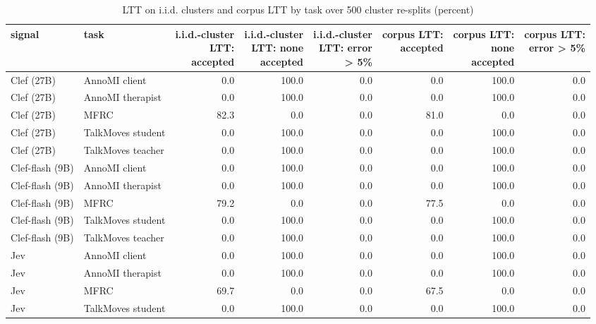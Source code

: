\begin{table}[t]
\centering
\small
\caption{LTT on i.i.d. clusters and corpus LTT by task over 500 cluster re-splits (percent)}
\label{tab:tab07d_resplits_guaranteed}
\begin{adjustbox}{max width=\linewidth}
\begin{tabular}{llrrrrrr}
\toprule
signal & task & \makecell[br]{i.i.d.-cluster \\{} LTT: \\{} accepted} & \makecell[br]{i.i.d.-cluster \\{} LTT: none \\{} accepted} & \makecell[br]{i.i.d.-cluster \\{} LTT: error \\{} > 5\%} & \makecell[br]{corpus LTT: \\{} accepted} & \makecell[br]{corpus LTT: \\{} none \\{} accepted} & \makecell[br]{corpus LTT: \\{} error > 5\%} \\
\midrule
Clef (27B) & AnnoMI client & 0.0 & 100.0 & 0.0 & 0.0 & 100.0 & 0.0 \\
Clef (27B) & AnnoMI therapist & 0.0 & 100.0 & 0.0 & 0.0 & 100.0 & 0.0 \\
Clef (27B) & MFRC & 82.3 & 0.0 & 0.0 & 81.0 & 0.0 & 0.0 \\
Clef (27B) & TalkMoves student & 0.0 & 100.0 & 0.0 & 0.0 & 100.0 & 0.0 \\
Clef (27B) & TalkMoves teacher & 0.0 & 100.0 & 0.0 & 0.0 & 100.0 & 0.0 \\
Clef-flash (9B) & AnnoMI client & 0.0 & 100.0 & 0.0 & 0.0 & 100.0 & 0.0 \\
Clef-flash (9B) & AnnoMI therapist & 0.0 & 100.0 & 0.0 & 0.0 & 100.0 & 0.0 \\
Clef-flash (9B) & MFRC & 79.2 & 0.0 & 0.0 & 77.5 & 0.0 & 0.0 \\
Clef-flash (9B) & TalkMoves student & 0.0 & 100.0 & 0.0 & 0.0 & 100.0 & 0.0 \\
Clef-flash (9B) & TalkMoves teacher & 0.0 & 100.0 & 0.0 & 0.0 & 100.0 & 0.0 \\
Jev & AnnoMI client & 0.0 & 100.0 & 0.0 & 0.0 & 100.0 & 0.0 \\
Jev & AnnoMI therapist & 0.0 & 100.0 & 0.0 & 0.0 & 100.0 & 0.0 \\
Jev & MFRC & 69.7 & 0.0 & 0.0 & 67.5 & 0.0 & 0.0 \\
Jev & TalkMoves student & 0.0 & 100.0 & 0.0 & 0.0 & 100.0 & 0.0 \\

\end{tabular}
\end{adjustbox}
\end{table}
